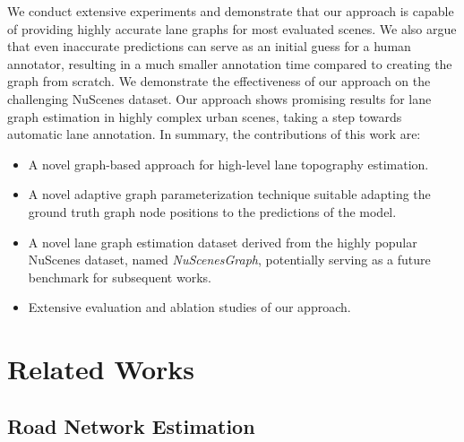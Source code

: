 \documentclass[letterpaper, 10 pt, conference]{ieeeconf}
\begin{document}
We conduct extensive experiments and demonstrate that our approach is capable of providing highly accurate lane graphs for most evaluated scenes. We also argue that even inaccurate predictions can serve as an initial guess for a human annotator, resulting in a much smaller annotation time compared to creating the graph from scratch. We demonstrate the effectiveness of our approach on the challenging NuScenes dataset. Our approach shows promising results for lane graph estimation in highly complex urban scenes, taking a step towards automatic lane annotation. In summary, the contributions of this work are:

\begin{itemize}
    \item A novel graph-based approach for high-level lane topography estimation.
    \item A novel adaptive graph parameterization technique suitable adapting the ground truth graph node positions to the predictions of the model.
    \item A novel lane graph estimation dataset derived from the highly popular NuScenes dataset, named \textit{NuScenesGraph}, potentially serving as a future benchmark for subsequent works.
    \item Extensive evaluation and ablation studies of our approach.
\end{itemize}


 
\section{Related Works}
\label{sec:relatedworks}



\subsection{Road Network Estimation}
\end{document}

